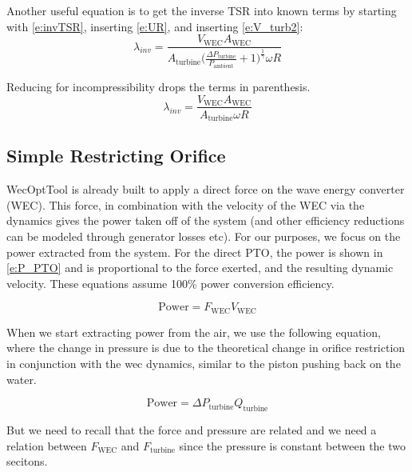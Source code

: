 \documentclass[conf]{new-aiaa}
\begin{document}
Another useful equation is to get the inverse TSR into known terms by starting with \cref{e:invTSR}, inserting \cref{e:UR}, and inserting \cref{e:V_turb2}:
    \begin{equation}
\label{e:TSR2}
\lambda_{inv} =  \frac{V_\text{WEC} A_\text{WEC}} {A_\text{turbine} \bigg(\frac{\Delta P_\text{turbine} }{P_\text{ambient} } + 1\bigg)^\frac{1}{\gamma} \omega R}
\end{equation}

Reducing for incompressibility drops the terms in parenthesis.
    \begin{equation}
\label{e:TSRincompressible}
\lambda_{inv} =  \frac{V_\text{WEC} A_\text{WEC}} {A_\text{turbine} \omega R}
\end{equation}



\subsection{Simple Restricting Orifice}

WecOptTool is already built to apply a direct force on the wave energy converter (WEC).  This force, in combination with the velocity of the WEC via the dynamics gives the power taken off of the system (and other efficiency reductions can be modeled through generator losses etc).  For our purposes, we focus on the power extracted from the system.  For the direct PTO, the power is shown in \cref{e:P_PTO} and is proportional to the force exerted, and the resulting dynamic velocity.  These equations assume 100\% power conversion efficiency.

\begin{equation}
\label{e:P_PTO}
\text{Power} = F_\text{WEC} V_\text{WEC}
\end{equation}

When we start extracting power from the air, we use the following equation, where the change in pressure is due to the theoretical change in orifice restriction in conjunction with the wec dynamics, similar to the piston pushing back on the water.

\begin{equation}
\label{e:P_air}
\text{Power} = \Delta P_\text{turbine} Q_\text{turbine}
\end{equation}

But we need to recall that the force and pressure are related and we need a relation between $F_\text{WEC}$ and $F_\text{turbine}$ since the pressure is constant between the two secitons.
\end{document}
